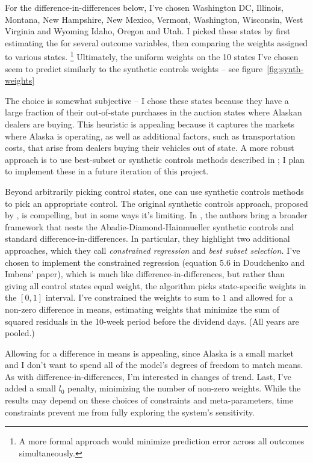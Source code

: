 \documentclass[11pt,letterpaper,oneside]{article}
\begin{document}
\begin{doublespacing}
For the difference\hyp{}in\hyp{}differences below, I've chosen Washington DC, Illinois, Montana, New Hampshire, New Mexico, Vermont, Washington, Wisconsin, West Virginia and Wyoming Idaho, Oregon and Utah.
I picked these states by first estimating the \textcite{DoudchenkoImbens2016DD} for several outcome variables, then comparing the weights assigned to various states.%
\footnote{A more formal approach would minimize prediction error across all outcomes simultaneously.}
Ultimately, the uniform weights on the 10 states I've chosen seem to predict similarly to the synthetic controls weights -- see figure~\ref{fig:synth-weights}

The choice is somewhat subjective -- I chose these states because they have a large fraction of their out\hyp{}of\hyp{}state purchases in the auction states where Alaskan dealers are buying.
This heuristic is appealing because it captures the markets where Alaska is operating, as well as additional factors, such as transportation costs, that arise from dealers buying their vehicles out of state.
A more robust approach is to use best\hyp{}subset or synthetic controls methods described in \textcite{DoudchenkoImbens2016DD}; I plan to implement these in a future iteration of this project.

Beyond arbitrarily picking control states, one can use synthetic controls methods to pick an appropriate control.
The original synthetic controls approach, proposed by \textcite{abadie2010synthetic} , is compelling, but in some ways it's limiting.
In \textcite{DoudchenkoImbens2016DD}, the authors bring a broader framework that nests the Abadie-Diamond-Hainmueller synthetic controls and standard difference-in-differences.
In particular, they highlight two additional approaches, which they call \textit{constrained regression} and \textit{best subset selection.}
I've chosen to implement the constrained regression (equation 5.6 in Doudchenko and Imbens' paper), which is much like difference-in-differences, but rather than giving all control states equal weight, the algorithm picks state-specific weights in the $[0, 1]$ interval.
I've constrained the weights to sum to $1$ and allowed for a non-zero difference in means, estimating weights that minimize the sum of squared residuals in the 10-week period before the dividend days. (All years are pooled.)

Allowing for a difference in means is appealing, since Alaska is a small market and I don't want to spend all of the model's degrees of freedom to match means.
As with difference-in-differences, I'm interested in changes of trend.
Last, I've added a small $l_0$ penalty, minimizing the number of non-zero weights.
While the results may depend on these choices of constraints and meta-parameters, time constraints prevent me from fully exploring the system's sensitivity.


\end{doublespacing}
\end{document}
